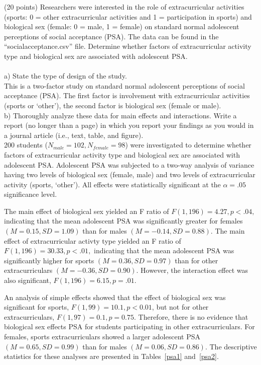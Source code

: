 \documentclass[onecolumn,10pt]{jhwhw}
\begin{document}
\clearpage
\problem{}
(20 points) Researchers were interested in the role of extracurricular activities (sports: 0 = other extracurricular activities and 1 = participation in sports) and biological sex (female: 0 = male, 1 = female) on standard normal adolescent perceptions of social acceptance (PSA). The data can be found in the “socialacceptance.csv” file. Determine whether factors of extracurricular activity type and biological sex are associated with adolescent PSA.\\
\\
a) State the type of design of the study.\\

This is a two-factor study on standard normal adolescent perceptions of social acceptance (PSA). The first factor is involvement with extracurricular activities (sports or `other'), the second factor is biological sex (female or male).
\\

b) Thoroughly analyze these data for main effects and interactions. Write a report (no longer than a page) in which you report your findings as you would in a journal article (i.e., text, table, and figure).\\

200 students ($N_{male}=102, N_{female}=98$) were investigated to determine whether factors of extracurricular activity type and biological sex are associated with adolescent PSA. Adolescent PSA was subjected to a two-way analysis of variance having two levels of biological sex (female, male) and two levels of extracurricular activity (sports, `other'). All effects were statistically significant at the $\alpha=.05$ significance level.

The main effect of biological sex yielded an F ratio of $F(1, 196) = 4.27, p < .04,$ indicating that the mean adolescent PSA was significantly greater for females $(M = 0.15, SD = 1.09)$ than for males $(M = -0.14, SD = 0.88)$. The main effect of extracurricular activty type yielded an F ratio of $F(1, 196) = 30.33, p < .01,$ indicating that the mean adolescent PSA was significantly higher for sports $(M = 0.36, SD = 0.97)$ than for other extracurriculars $(M = -0.36, SD = 0.90)$. However, the interaction effect was also significant, $F(1, 196) = 6.15, p = .01$.

An analysis of simple effects showed that the effect of biological sex was significant for sports, $F(1, 99) = 10.1, p < 0.01$, but not for other extracurriculars, $F(1, 97) = 0.1, p = 0.75$. Therefore, there is no evidence that biological sex effects PSA for students participating in other extracurriculars. For females, sports extracurriculars showed a larger adolescent PSA $(M=0.65, SD=0.99)$ than for males $(M=0.06, SD=0.86)$. The descriptive statistics for these analyses are presented in Tables~\ref{psa1} and~\ref{psa2}. \\
\end{document}
